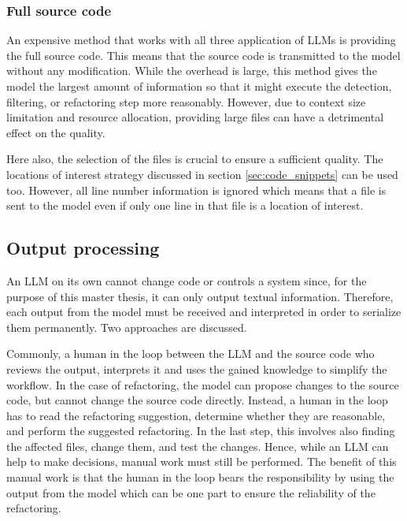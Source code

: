 \subsubsection{Full source code}

An expensive method that works with all three application of \acp{LLM} is providing the full source code. This means that the source code is transmitted to the model without any modification. While the overhead is large, this method gives the model the largest amount of information so that it might execute the detection, filtering, or refactoring step more reasonably. However, due to context size limitation and resource allocation, providing large files can have a detrimental  effect on the quality. 

Here also, the selection of the files is crucial to ensure a sufficient quality. The locations of interest strategy discussed in section \ref{sec:code_snippets} can be used too. However, all line number information is ignored which means that a file is sent to the model even if only one line in that file is a location of interest. 




\subsection{Output processing}\label{sec:output_processing}
An \ac{LLM} on its own cannot change code or controls a system since, for the purpose of this master thesis, it  can only output textual information. Therefore, each output from the model must be received and interpreted  in order to serialize them permanently. Two approaches are discussed. 

Commonly, a human in the loop between the \ac{LLM} and the source code who reviews the output, interprets it and uses the gained knowledge to simplify the workflow. In the case of refactoring, the model can propose changes to the source code, but cannot change the source code directly. Instead, a human in the loop has to read the refactoring suggestion, determine whether they are reasonable, and perform the suggested refactoring. In the last step, this involves also finding the affected files, change them, and test the changes. Hence, while an \ac{LLM} can help to make decisions, manual work must still be performed. The benefit of this manual work is that the human in the loop bears the responsibility by using the output from the model which can be one part to ensure the reliability of the refactoring. 

